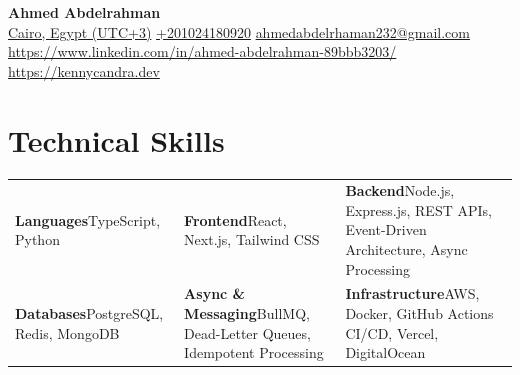 \documentclass[10pt, a4paper]{article}
\begin{document}
\begin{center}
  {\LARGE\bfseries\color{primary} Ahmed Abdelrahman}\\[6pt]
  {\small\color{subtle} \href{Cairo, Egypt (UTC+3)}{Cairo, Egypt (UTC+3)} \;\textcolor{divider}{\textbar{}}\; \href{+201024180920}{+201024180920} \;\textcolor{divider}{\textbar{}}\; \href{ahmedabdelrhaman232@gmail.com}{ahmedabdelrhaman232@gmail.com} \;\textcolor{divider}{\textbar{}}\; \href{https://www.linkedin.com/in/ahmed-abdelrahman-89bbb3203/}{https://www.linkedin.com/in/ahmed-abdelrahman-89bbb3203/} \;\textcolor{divider}{\textbar{}}\; \href{https://kennycandra.dev}{https://kennycandra.dev}}
\end{center}

\vspace{-4pt}

\section{Technical Skills}
\begin{tabularx}{\textwidth}{X X X}
\textbf{Languages}\newline TypeScript, Python & \textbf{Frontend}\newline React, Next.js, Tailwind CSS & \textbf{Backend}\newline Node.js, Express.js, REST APIs, Event-Driven Architecture, Async Processing \\[4pt]
\textbf{Databases}\newline PostgreSQL, Redis, MongoDB & \textbf{Async \& Messaging}\newline BullMQ, Dead-Letter Queues, Idempotent Processing & \textbf{Infrastructure}\newline AWS, Docker, GitHub Actions CI/CD, Vercel, DigitalOcean \\[4pt]
\end{tabularx}

\end{document}
